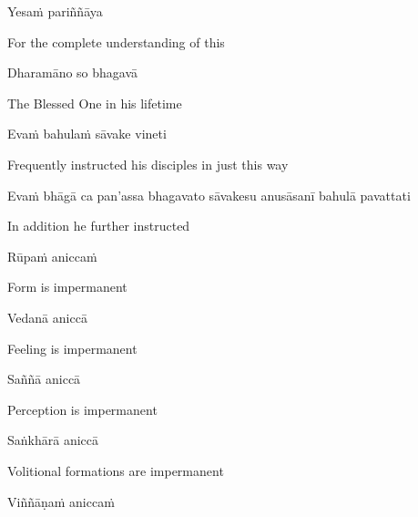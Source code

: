 \suttaRef{[DN 22]}

Yesaṁ pariññāya

\begin{english}
  For the complete understanding of this
\end{english}

Dharamāno so bhagavā

\begin{english}
  The Blessed One in his lifetime
\end{english}

Evaṁ bahulaṁ sāvake vineti

\begin{english}
  Frequently instructed his disciples in just this way
\end{english}

\begin{pali-hang}
  Evaṁ bhāgā ca pan'assa bhagavato sāvakesu anusāsanī bahulā pavattati
\end{pali-hang}

\begin{english}
  In addition he further instructed
\end{english}

\suttaRef{[Thai]}

Rūpaṁ aniccaṁ

\begin{english}
  Form is impermanent
\end{english}

Vedanā aniccā

\begin{english}
  Feeling is impermanent
\end{english}

Saññā aniccā

\begin{english}
  Perception is impermanent
\end{english}

\ifbfive\clearpage\fi

Saṅkhārā aniccā

\begin{english}
  Volitional formations are impermanent\ifdigital\makeatletter\hyperlink{endnote18-appendix}\makeatother\fi
\end{english}

Viññāṇaṁ aniccaṁ

